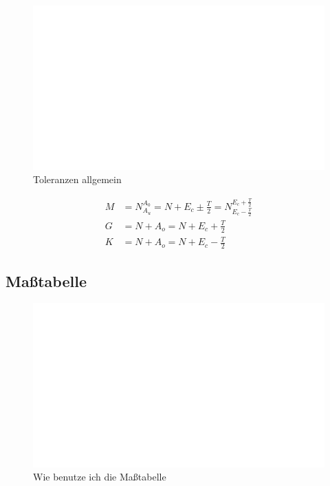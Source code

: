\begin{figure}[h]
	\centering
	\includegraphics[scale=0.9]{leer.png}
	\caption{Toleranzen allgemein}
\end{figure}

\begin{align*}
M &= N^{A_0}_{A_u} = N + E_c \pm \frac{T}{2} = N^{E_c + \frac{T}{2}}_{E_c - \frac{T}{2}} \\
G &= N + A_o = N + E_c + \frac{T}{2} \\
K &= N + A_o = N + E_c - \frac{T}{2}
\end{align*}

\newpage

\subsection*{Maßtabelle}

\begin{figure}[h]
	\centering
	\includegraphics[scale=0.9]{leer.png}
	\caption{Wie benutze ich die Maßtabelle}
\end{figure}








